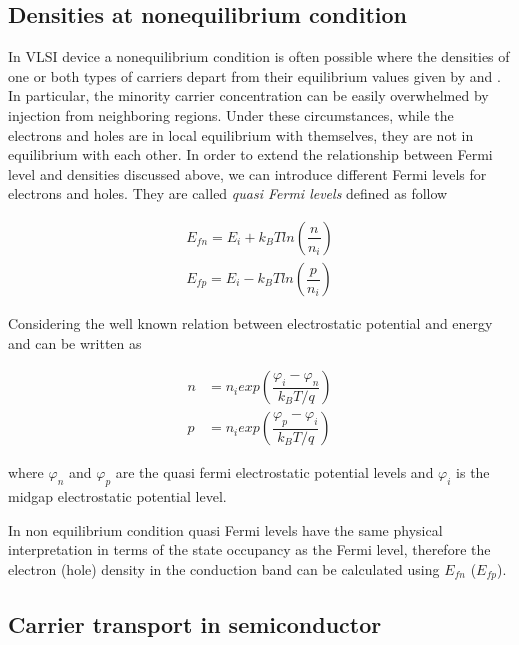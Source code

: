 \subsection{Densities at nonequilibrium condition}

In VLSI device a nonequilibrium condition is often possible where the densities of one or both types of carriers depart from their equilibrium values given by  and .
In particular, the minority carrier concentration can be easily overwhelmed by injection from neighboring regions. Under these circumstances, while the electrons and holes are in local equilibrium with themselves, they are not in equilibrium with each other. In order to extend the relationship between Fermi level and densities discussed above, we can introduce different Fermi levels for electrons and holes. They are called \textit{quasi Fermi levels} defined as follow

\begin{align}
E_{fn} = E_i + k_B T ln\left( \dfrac{n}{n_i} \right) \label{eq: quasi fermi level electron} \\
E_{fp} = E_i - k_B T ln\left( \dfrac{p}{n_i} \right) \label{eq: quasi fermi level hole}
\end{align}


Considering the well known relation between electrostatic potential and energy  and  can be written as

\begin{align}
n & = n_i exp\left(\dfrac{\varphi_{i}-\varphi_n}{k_BT/q}\right) \label{eq: non eq n density mb}\\
p & = n_i exp\left(\dfrac{\varphi_p-\varphi_{i}}{k_BT/q}\right)  \label{eq: non eq p density mb}
\end{align}

where $\varphi_n$ and $\varphi_p$ are the quasi fermi electrostatic potential levels and $\varphi_i$ is the midgap electrostatic potential level. 

\begin{Osservazione}
In non equilibrium condition quasi Fermi levels have the same physical interpretation in terms of the state occupancy as the Fermi level, therefore the electron (hole) density in the conduction band can be calculated using $E_{fn}$ ($E_{fp}$).
\end{Osservazione}

\subsection{Carrier transport in semiconductor}
\label{sec: carrier transport}

